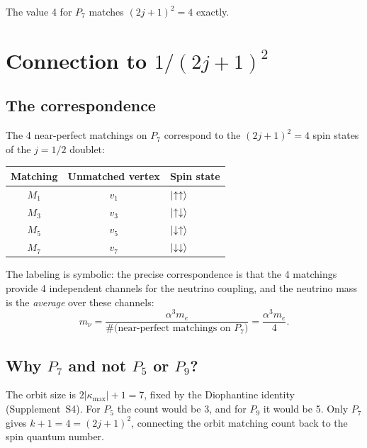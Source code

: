 \documentclass[11pt,letterpaper]{article}
\numberwithin{equation}{section}
\begin{document}
The value 4 for $P_7$ matches $(2j+1)^2 = 4$ exactly.

\section{Connection to $1/(2j+1)^2$}
\label{sec:connection}

\subsection{The correspondence}

The 4 near-perfect matchings on $P_7$ correspond to the $(2j+1)^2 = 4$
spin states of the $j = 1/2$ doublet:

\begin{center}
\begin{tabular}{ccl}
\toprule
Matching & Unmatched vertex & Spin state \\
\midrule
$M_1$ & $v_1$ & $\ket{\uparrow\uparrow}$ \\
$M_3$ & $v_3$ & $\ket{\uparrow\downarrow}$ \\
$M_5$ & $v_5$ & $\ket{\downarrow\uparrow}$ \\
$M_7$ & $v_7$ & $\ket{\downarrow\downarrow}$ \\
\bottomrule
\end{tabular}
\end{center}

The labeling is symbolic: the precise correspondence is that the 4 matchings
provide 4 independent channels for the neutrino coupling, and the neutrino
mass is the \emph{average} over these channels:
\begin{equation}
  m_\nu = \frac{\alpha^3 m_e}{\#\text{(near-perfect matchings on }P_7\text{)}}
  = \frac{\alpha^3 m_e}{4}.
\end{equation}

\subsection{Why $P_7$ and not $P_5$ or $P_9$?}

The orbit size is $2|\kappa_\mathrm{max}| + 1 = 7$, fixed by the Diophantine
identity (Supplement~S4). For $P_5$ the count would be 3, and for $P_9$ it
would be 5. Only $P_7$ gives $k + 1 = 4 = (2j+1)^2$, connecting the orbit
matching count back to the spin quantum number.
\end{document}
